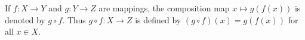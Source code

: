If $f: X \rightarrow Y$ and $g: Y \rightarrow Z$ are mappings, the composition map $x \mapsto g(f(x))$ is denoted by $g \circ f$. Thus $g \circ f: X \rightarrow Z$ is defined by $(g \circ f)(x) = g(f(x))$ for all $x \in X$.
